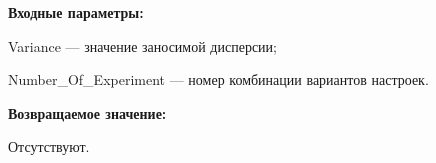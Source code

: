 \textbf{Входные параметры:}

	 Variance --- значение заносимой дисперсии;
 
    Number\_Of\_Experiment --- номер комбинации вариантов настроек.

\textbf{Возвращаемое значение:}

Отсутствуют.